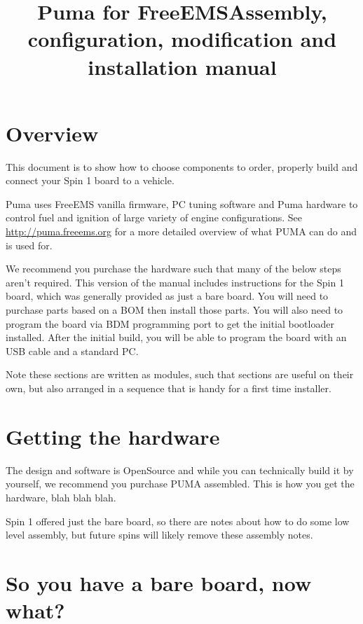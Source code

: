 \documentclass[12pt,a4paper,titlepage]{article}
\author{}
\title{Puma for FreeEMS\newline Assembly, configuration, modification and installation manual}
\begin{document}
\maketitle
\pagebreak

\tableofcontents
\thispagestyle{empty}
\pagebreak

\section{Overview}

This document is to show how to choose components to order, properly build and connect your Spin 1 board to a vehicle.

Puma uses FreeEMS vanilla firmware, PC tuning software and Puma hardware to control fuel and ignition of large variety of engine configurations. See \url{http://puma.freeems.org} for a more detailed overview of what PUMA can do and is used for. 

We recommend you purchase the hardware such that many of the below steps aren't required. This version of the manual includes instructions for the Spin 1 board, which was generally provided as just a bare board. You will need to purchase parts based on a BOM then install those parts. You will also need to program the board via BDM programming port to get the initial bootloader installed. After the initial build, you will be able to program the board with an USB cable and a standard PC.

Note these sections are written as modules, such that sections are useful on their own, but also arranged in a sequence that is handy for a first time installer. 

\section{Getting the hardware}

The design and software is OpenSource and while you can technically build it by yourself, we recommend you purchase PUMA assembled. This is how you get the hardware, blah blah blah.

Spin 1 offered just the bare board, so there are notes about how to do some low level assembly, but future spins will likely remove these assembly notes. 

\section{So you have a bare board, now what?}
\end{document}
